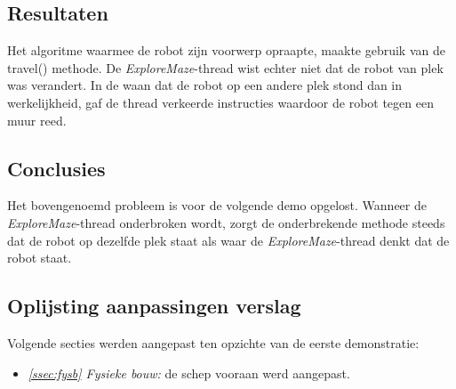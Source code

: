 \documentclass[tt2]{penoverslag}
\begin{document}
\subsection{Resultaten} %
\label{Assec:result1}
Het algoritme waarmee de robot zijn voorwerp opraapte, maakte gebruik van de travel() methode. De \textit{ExploreMaze}-thread wist echter niet dat de robot van plek was verandert. In de waan dat de robot op een andere plek stond dan in werkelijkheid, gaf de thread verkeerde instructies waardoor de robot tegen een muur reed.

\subsection{Conclusies} %
\label{Assec:conc1}
Het bovengenoemd probleem is voor de volgende demo opgelost. Wanneer de \textit{ExploreMaze}-thread onderbroken wordt, zorgt de onderbrekende methode steeds dat de robot op dezelfde plek staat als waar de \textit{ExploreMaze}-thread denkt dat de robot staat.


\subsection{Oplijsting aanpassingen verslag} %
\label{Assec:aanp1}
Volgende secties werden aangepast ten opzichte van de eerste demonstratie:

\begin{itemize}
\item \textit{\ref{ssec:fysb} Fysieke bouw:} de schep vooraan werd aangepast.
\end{itemize}
\end{document}
